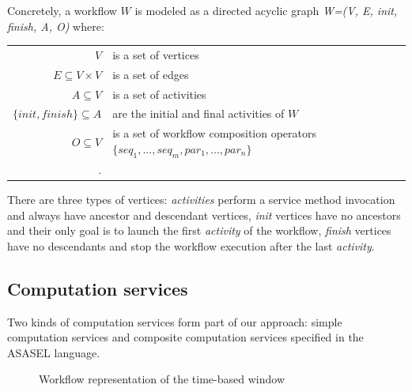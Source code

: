 Concretely, a workflow $W$ is modeled as a directed acyclic graph \textit{W=(V, E, init, finish, A, O)} where:
		\begin{center}
			\footnotesize
			\begin{tabular}{rp{5.5cm}}
				$V$                      & is a set of vertices \\
				$E \subseteq V \times V$ & is a set of edges \\
				$A \subseteq V$          & is a set of activities \\
				$\{init, finish\} \subseteq A$     & are the initial and final activities of $W$\\
				$O \subseteq V$          & is a set of workflow composition operators $\{seq_1,...,seq_m,par_1,...,par_n\}$\\.     
			\end{tabular}   
		\end{center}
There are three types of vertices: \textit{activities} perform a service method invocation and always have ancestor and descendant vertices, \textit{init} vertices have no ancestors and their only goal is to launch the first \textit{activity} of the workflow, \textit{finish} vertices have no descendants and stop the workflow execution after the last \textit{activity}.

\subsection{Computation services}\label{subsec:computationServices}

Two kinds of computation services form part of our approach: simple computation services and composite computation services specified in the ASASEL language.

\begin{figure}
   \begin{center}
   \end{center}
   \caption{Workflow representation of the time-based window}
   \label{fig:timeBasedWindowWF}
\end{figure}


